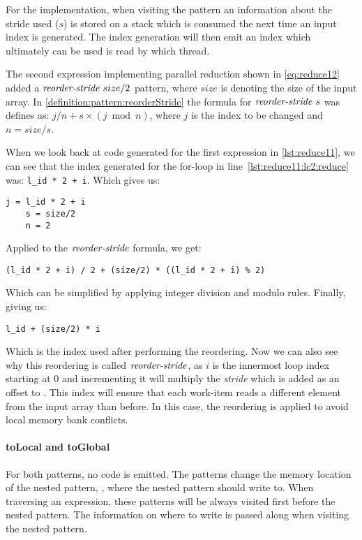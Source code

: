 For the implementation, when visiting the \reorderStride pattern an information about the stride used ($s$) is stored on a stack which is consumed the next time an input index is generated.
The index generation will then emit an index which ultimately can be used  is read by which thread.

The second expression implementing parallel reduction shown in \autoref{eq:reduce12} added a $\text{\textit{reorder-stride}}\ size/2$ pattern, where $size$ is denoting the size of the input array.
In \autoref{definition:pattern:reorderStride} the formula for $\text{\textit{reorder-stride}}\ s$ was defines as: $j / n + s \times (j \bmod{n})$, where $j$ is the index to be changed and $n = size / s$.

When we look back at \OpenCL code generated for the first expression in \autoref{lst:reduce11}, we can see that the index generated for the for-loop in line~\ref{lst:reduce11:lc2:reduce} was:
\lstinline!l_id * 2 + i!.
Which gives us:
\begin{lstlisting}[numbers=none, frame=none]
    j = l_id * 2 + i
    s = size/2
    n = 2
\end{lstlisting}
Applied to the $\text{\textit{reorder-stride}}$ formula, we get:
\begin{lstlisting}[numbers=none, frame=none]
    (l_id * 2 + i) / 2 + (size/2) * ((l_id * 2 + i) % 2)
\end{lstlisting}
Which can be simplified by applying integer division and modulo rules. Finally, giving us:
\begin{lstlisting}[numbers=none, frame=none]
    l_id + (size/2) * i
\end{lstlisting}
Which is the index used after performing the reordering.
Now we can also see why this reordering is called $\text{\textit{reorder-stride}}$, as $i$ is the innermost loop index starting at $0$ and incrementing it will multiply the \emph{stride} which is added as an offset to .
This index will ensure that each work-item reads a different element from the input array than before.
In this case, the reordering is applied to avoid local memory bank conflicts.

\paragraph{{\footnotesize to}Local and {\footnotesize to}Global}
For both patterns, no \OpenCL code is emitted.
The patterns change the memory location of the nested pattern, \ie, where the nested pattern should write to.
When traversing an expression, these patterns will be always visited first before the nested pattern.
The information on where to write is passed along when visiting the nested pattern.

